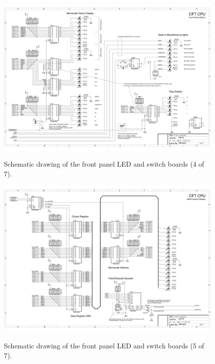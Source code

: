\documentclass[11pt,a4paper,twocolumns]{article}
\begin{document}
\begin{figure}
\centering
\includegraphics[width=0.95\textheight,angle=90]{figs/front-panel-4.jpg}\\
\caption{\label{fig-schematic-front-panel-4}Schematic drawing of the front panel LED and switch boards (4 of 7).}
\end{figure}

\begin{figure}
\centering
\includegraphics[width=0.95\textheight,angle=90]{figs/front-panel-5.jpg}\\
\caption{\label{fig-schematic-front-panel-5}Schematic drawing of the front panel LED and switch boards (5 of 7).}
\end{figure}
\end{document}
